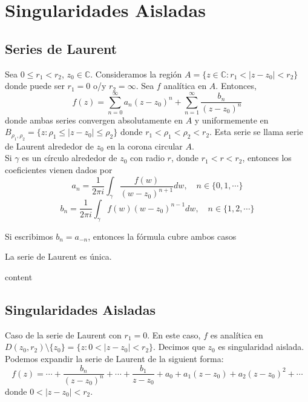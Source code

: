 \chapter{Singularidades Aisladas}

\section{Series de Laurent}

\begin{theo}
  Sea $0 \leq r_{1} < r_{2}$, $z_{0} \in \mathbb{C}$. Consideramos la región $A = \{ z \in \mathbb{C} : r_{1} < | z -z_{0} | < r_{2} \}$ donde puede ser $r_{1} = 0$ o/y $r_{2} = \infty$. Sea $f$ analítica en $A$. Entonces,
  \[ 
    f(z) = \sum_{n = 0}^{\infty} a_{n}(z - z_{0})^{n} + \sum_{n = 1}^{\infty} \frac{b_{n}}{(z - z_{0})^{n}} 
  \] 
  donde ambas series convergen absolutamente en $A$ y uniformemente en $B_{\rho_{1}, \rho_{2}} = \big\{ z : \rho_{1} \leq | z - z_{0} | \leq \rho_{2} \big\}$ donde $r_{1} < \rho_{1} < \rho_{2} < r_{2}$. Esta serie se llama serie de Laurent alrededor de $z_{0}$ en la corona circular $A$. \\

  Si $\gamma$ es un círculo alrededor de $z_{0}$ con radio $r$, donde $r_{1} < r < r_{2}$, entonces los coeficientes vienen dados por
  \[ 
    a_{n} = \frac{1}{2 \pi i} \int_{\gamma}^{} \frac{f(w)}{(w - z_{0})^{n + 1}} dw, \quad n \in \{ 0, 1, \cdots \}
  \] 
  \[ 
    b_{n} = \frac{1}{2 \pi i} \int_{\gamma}^{} f(w){(w - z_{0})^{n - 1}} dw, \quad n \in \{ 1, 2, \cdots \}
  \] 
\end{theo}

\begin{obs}
  Si escribimos $b_{n} = a_{-n}$, entonces la fórmula cubre ambos casos
\end{obs}

\begin{obs}
  La serie de Laurent es única.
\end{obs}

\begin{dem}
  content
\end{dem}

\section{Singularidades Aisladas}

\begin{defn}
  Caso de la serie de Laurent con $r_{1} = 0$. En este caso, $f$ es analítica en $D(z_{0}, r_{2}) \setminus \{ z_{0} \} = \{ z : 0 < | z -z_{0} | < r_{2} \}$. Decimos que $z_{0}$ es singularidad aislada. Podemos expandir la serie de Laurent de la siguient forma:
  \[ 
    f(z) = \cdots + \frac{b_{n}}{(z - z_{0})^{n}} + \cdots + \frac{b_{1}}{z - z_{0}} + a_{0} + a_{1}(z -z_{0}) + a_{2}(z - z_{0})^{2} + \cdots
  \] 
  donde $ 0 < | z - z_{0} | < r_{2}$.
\end{defn}

